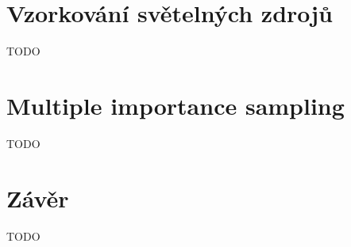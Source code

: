 \documentclass[czech,master]{diploma}
\begin{document}
\section{Vzorkování světelných zdrojů}
TODO

\section{Multiple importance sampling}
TODO

\section{Závěr}
TODO

\printbibliography[title={Literatura}, heading=bibintoc]

\appendix
\end{document}
